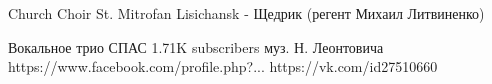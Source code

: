 



Church Choir St. Mitrofan Lisichansk - Щедрик (регент Михаил Литвиненко)

Вокальное трио СПАС
1.71K subscribers
муз. Н. Леонтовича
https://www.facebook.com/profile.php?...
https://vk.com/id27510660








